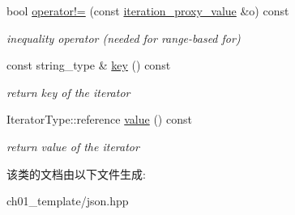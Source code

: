 \begin{DoxyCompactItemize}
\mbox{\label{classnlohmann_1_1detail_1_1iteration__proxy__value_a646dbb2b1842f44f42ee1e14245b8595}} 
bool \mbox{\hyperlink{classnlohmann_1_1detail_1_1iteration__proxy__value_a646dbb2b1842f44f42ee1e14245b8595}{operator!=}} (const \mbox{\hyperlink{classnlohmann_1_1detail_1_1iteration__proxy__value}{iteration\+\_\+proxy\+\_\+value}} \&o) const
\begin{DoxyCompactList}\small\item\em inequality operator (needed for range-\/based for) \end{DoxyCompactList}\item 
\mbox{\label{classnlohmann_1_1detail_1_1iteration__proxy__value_af2949ac0d70212738030bfda29c5bcc2}} 
const string\+\_\+type \& \mbox{\hyperlink{classnlohmann_1_1detail_1_1iteration__proxy__value_af2949ac0d70212738030bfda29c5bcc2}{key}} () const
\begin{DoxyCompactList}\small\item\em return key of the iterator \end{DoxyCompactList}\item 
\mbox{\label{classnlohmann_1_1detail_1_1iteration__proxy__value_ab8e33bd01c285a1a80b737a1905ceb97}} 
Iterator\+Type\+::reference \mbox{\hyperlink{classnlohmann_1_1detail_1_1iteration__proxy__value_ab8e33bd01c285a1a80b737a1905ceb97}{value}} () const
\begin{DoxyCompactList}\small\item\em return value of the iterator \end{DoxyCompactList}\end{DoxyCompactItemize}


该类的文档由以下文件生成\+:\begin{DoxyCompactItemize}
\item 
ch01\+\_\+template/json.\+hpp\end{DoxyCompactItemize}
